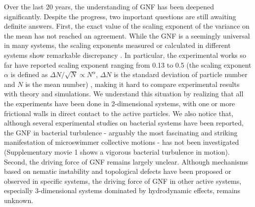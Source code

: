 \documentclass[twocolumn,aps,prl,amsmath,amssymb,longbibliography]{revtex4-2}
\begin{document}
Over the last 20 years, the understanding of GNF has been deepened significantly. Despite the progress, two important questions are still awaiting definite answers.
First, the exact value of the scaling exponent of the variance on the mean has not reached an agreement. While the GNF is a seemingly universal in many systems, the scaling exponents measured or calculated in different systems show remarkable discrepancy \cite{AditiSimha2002, Ramaswamy2003, Narayan2007, Chate2008, Deseigne2010, Zhang2010,
Dey2012, Saintillan2012, Schaller2013, Ngo2014, Nishiguchi2017, Kawaguchi2017, Mahault2019,
Karani2019}. In particular, the experimental works so far have reported scaling exponent ranging from 0.13 to 0.5 (the scaling exponent $\alpha$ is defined as $\Delta N /\sqrt N \propto N^\alpha$, $\Delta N$ is the standard deviation of particle number and $N$ is the mean number)
\cite{Narayan2007, Deseigne2010, Zhang2010, Schaller2013, Nishiguchi2017, Kawaguchi2017, Karani2019}, making it hard to compare experimental results with theory and simulations. We understand this situation by realizing that all the experiments have been done in 2-dimensional systems, with one or more frictional walls in direct contact to the active particles. We also notice that, although several experimental studies on bacterial systems have been reported, the GNF in bacterial turbulence - arguably the most fascinating and striking manifestation of microswimmer collective motions - has not been investigated (Supplementary movie 1 shows a vigorous bacterial turbulence in motion). Second, the driving force of GNF remains largely unclear. Although mechanisms based on nematic instability
\cite{AditiSimha2002, Ramaswamy2003, Narayan2007} and topological defects \cite{Saintillan2008b, Schaller2013} have been proposed or observed in specific systems, the driving force of GNF in other active systems, especially 3-dimensional systems dominated by hydrodynamic effects, remains unknown.
\end{document}
